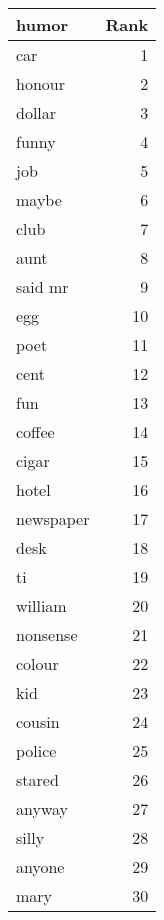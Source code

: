 \begin{table}
\label{tab:humor_terms}
\begin{tabular}{lr}
\toprule
humor & Rank \\
\midrule
car & 1 \\
honour & 2 \\
dollar & 3 \\
funny & 4 \\
job & 5 \\
maybe & 6 \\
club & 7 \\
aunt & 8 \\
said mr & 9 \\
egg & 10 \\
poet & 11 \\
cent & 12 \\
fun & 13 \\
coffee & 14 \\
cigar & 15 \\
hotel & 16 \\
newspaper & 17 \\
desk & 18 \\
ti & 19 \\
william & 20 \\
nonsense & 21 \\
colour & 22 \\
kid & 23 \\
cousin & 24 \\
police & 25 \\
stared & 26 \\
anyway & 27 \\
silly & 28 \\
anyone & 29 \\
mary & 30 \\
\bottomrule
\end{tabular}
\end{table}
